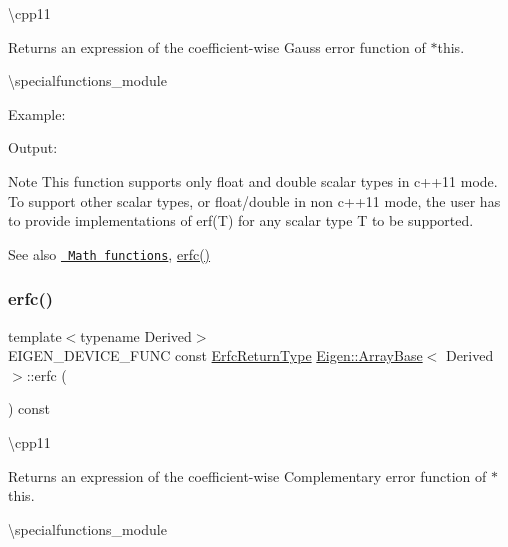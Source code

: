 \textbackslash{}cpp11 \begin{DoxyReturn}{Returns}
an expression of the coefficient-\/wise Gauss error function of $\ast$this.
\end{DoxyReturn}
\textbackslash{}specialfunctions\+\_\+module

Example\+: 
\begin{DoxyCodeInclude}{0}
\end{DoxyCodeInclude}
 Output\+: 
\begin{DoxyVerbInclude}
\end{DoxyVerbInclude}


\begin{DoxyNote}{Note}
This function supports only float and double scalar types in c++11 mode. To support other scalar types, or float/double in non c++11 mode, the user has to provide implementations of erf(\+T) for any scalar type T to be supported.
\end{DoxyNote}
\begin{DoxySeeAlso}{See also}
\href{group__CoeffwiseMathFunctions.html\#cwisetable_erf}{\texttt{ Math functions}}, \mbox{\hyperlink{class_eigen_1_1_array_base_a0b5dc4e2072be63b4920f7b88dc1bf83}{erfc()}} 
\end{DoxySeeAlso}
\mbox{\label{class_eigen_1_1_array_base_a0b5dc4e2072be63b4920f7b88dc1bf83}} 
\subsubsection{\texorpdfstring{erfc()}{erfc()}}
{\footnotesize\ttfamily template$<$typename Derived$>$ \\
E\+I\+G\+E\+N\+\_\+\+D\+E\+V\+I\+C\+E\+\_\+\+F\+U\+NC const \mbox{\hyperlink{class_eigen_1_1_cwise_unary_op}{Erfc\+Return\+Type}} \mbox{\hyperlink{class_eigen_1_1_array_base}{Eigen\+::\+Array\+Base}}$<$ Derived $>$\+::erfc (\begin{DoxyParamCaption}{ }\end{DoxyParamCaption}) const\hspace{0.3cm}{\ttfamily [inline]}}

\textbackslash{}cpp11 \begin{DoxyReturn}{Returns}
an expression of the coefficient-\/wise Complementary error function of $\ast$this.
\end{DoxyReturn}
\textbackslash{}specialfunctions\+\_\+module

